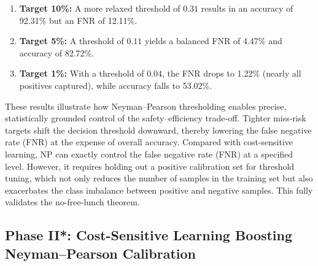 \documentclass[journal,twoside,web]{ieeecolor}
\begin{document}
\begin{enumerate}
    \item \textbf{Target 10\%:} A more relaxed threshold of $0.31$ results in an accuracy of 92.31\% but an FNR of 12.11\%.
    \item \textbf{Target 5\%:} A threshold of $0.11$ yields a balanced FNR of 4.47\% and accuracy of 82.72\%.
    \item \textbf{Target 1\%:} With a threshold of $0.04$, the FNR drops to 1.22\% (nearly all positives captured), while accuracy falls to 53.02\%.
\end{enumerate}

\begin{table}[htbp]
    \centering
    \caption{The prediction performance via NP threshold calibration.}
    \label{tab:table3}  
\end{table}

These results illustrate how Neyman–Pearson thresholding enables precise, statistically grounded control of the safety–efficiency trade‑off. Tighter miss‑risk targets shift the decision threshold downward, thereby lowering the false negative rate (FNR) at the expense of overall accuracy. Compared with cost-sensitive learning, NP can exactly control the false negative rate (FNR) at a specified level. However, it requires holding out a positive calibration set for threshold tuning, which not only reduces the number of samples in the training set but also exacerbates the class imbalance between positive and negative samples. This fully validates the no-free-lunch theorem.

\subsection{Phase II*: Cost-Sensitive Learning Boosting Neyman–Pearson Calibration}\label{S3-4}
\end{document}
